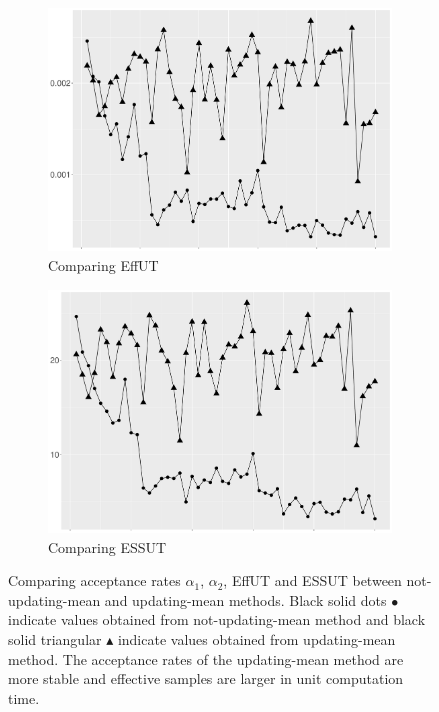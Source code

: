 \begin{figure}[ht]
\begin{subfigure}[t]{0.45\textwidth}
\includegraphics[width=\textwidth]{Chapters/05MCMCOU/plots/realdatacompareeffutnotupandup2.pdf}
   \caption{Comparing EffUT}
\end{subfigure}
\begin{subfigure}[t]{0.45\textwidth}
\includegraphics[width=\textwidth]{Chapters/05MCMCOU/plots/realdatacompareessutnotupandup2.pdf}
   \caption{Comparing ESSUT}
\end{subfigure}
\caption{Comparing acceptance rates $\alpha_1$, $\alpha_2$, EffUT and ESSUT between not-updating-mean and updating-mean methods. Black solid dots $\bullet$ indicate values obtained from not-updating-mean method and black solid triangular $\blacktriangle$ indicate values obtained from updating-mean method. The acceptance rates of the updating-mean method are more stable and effective samples are larger in unit computation time. }\label{comparenotanupfeatures}
\end{figure}


